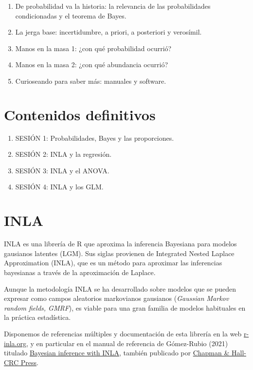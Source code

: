\documentclass[
]{book}
\providecommand{\tightlist}{%
  \setlength{\itemsep}{0pt}\setlength{\parskip}{0pt}}
\begin{document}
\begin{enumerate}
\def\labelenumi{\arabic{enumi}.}
\tightlist
\item
  De probabilidad va la historia: la relevancia de las probabilidades condicionadas y el teorema de Bayes.
\item
  La jerga base: incertidumbre, a priori, a posteriori y verosímil.
\item
  Manos en la masa 1: ¿con qué probabilidad ocurrió?
\item
  Manos en la masa 2: ¿con qué abundancia ocurrió?
\item
  Curioseando para saber más: manuales y software.
\end{enumerate}

\hypertarget{contenidos-definitivos}{%
\section{Contenidos definitivos}\label{contenidos-definitivos}}

\begin{enumerate}
\def\labelenumi{\arabic{enumi}.}
\tightlist
\item
  SESIÓN 1: Probabilidades, Bayes y las proporciones.
\item
  SESIÓN 2: INLA y la regresión.
\item
  SESIÓN 3: INLA y el ANOVA.
\item
  SESIÓN 4: INLA y los GLM.
\end{enumerate}

\hypertarget{inla}{%
\section{INLA}\label{inla}}

INLA es una librería de R que aproxima la inferencia Bayesiana para
modelos gausianos latentes (LGM). Sus siglas provienen de Integrated
Nested Laplace Approximation (INLA), que es un método para aproximar las
inferencias bayesianas a través de la aproximación de Laplace.

Aunque la metodología INLA se ha desarrollado sobre modelos que se
pueden expresar como campos aleatorios markovianos gausianos (\emph{Gaussian
Markov random fields, GMRF}), es viable para una gran familia de modelos
habituales en la práctica estadística.

Disponemos de referencias múltiples y documentación de esta librería en
la web \href{https://www.r-inla.org}{r-inla.org}, y en particular en el
manual de referencia de Gómez-Rubio (2021) titulado \href{https://becarioprecario.bitbucket.io/inla-gitbook/index.html}{Bayesian inference
with INLA},
también publicado por \href{https://www.routledge.com/Bayesian-inference-with-INLA/Gomez-Rubio/p/book/9781138039872}{Chapman \& Hall-CRC
Press}.
\end{document}
